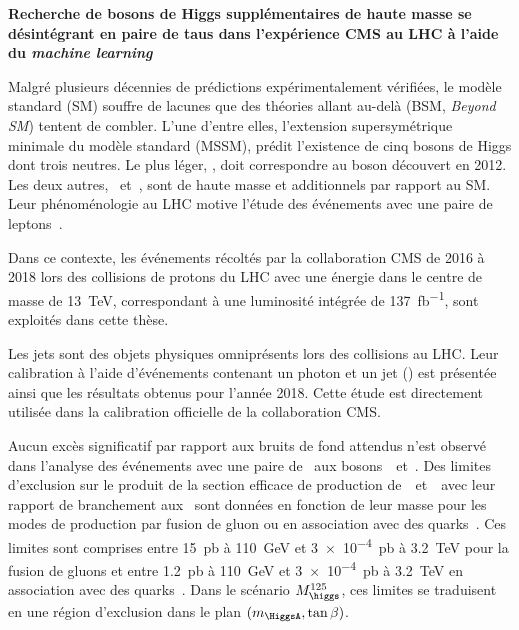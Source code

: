 \begin{center}
\LARGE
\bf
\sffamily
Recherche de bosons de Higgs supplémentaires de haute masse se désintégrant en paire de taus dans l'expérience CMS au LHC à l'aide du \emph{machine learning}
\end{center}

\vspace{2\baselineskip}

Malgré plusieurs décennies de prédictions expérimentalement vérifiées,
le modèle standard (SM) souffre de lacunes
que des théories allant au-delà (BSM, \emph{Beyond SM})
tentent de combler.
L'une d'entre elles,
l'extension supersymétrique minimale du modèle standard (MSSM),
prédit l'existence de cinq bosons de Higgs dont trois neutres.
Le plus léger, \higgs, doit correspondre au boson découvert en 2012.
Les deux autres, \Higgs\ et~\HiggsA, sont de haute masse et additionnels par rapport au SM.
Leur phénoménologie au LHC
motive l'étude des événements avec une paire de leptons~\tau.
\par
Dans ce contexte,
les événements récoltés par la collaboration CMS
de 2016 à 2018
lors des collisions de protons du LHC
avec une énergie dans le centre de masse de \SI{13}{\TeV},
correspondant à une luminosité intégrée de \SI{137}{\femto\barn^{-1}},
sont exploités dans cette thèse.
\par
Les jets sont des objets physiques omniprésents lors des collisions au LHC.
Leur calibration à l'aide d'événements contenant un photon et un jet (\Gjet) est présentée ainsi que les résultats obtenus pour l'année 2018.
Cette étude %
est directement utilisée dans la calibration officielle de la collaboration CMS.
\par
Aucun excès significatif par rapport aux bruits de fond attendus n'est observé
dans l'analyse des événements avec une paire de \tau\ aux bosons~\Higgs\ et~\HiggsA.
Des limites d'exclusion sur le produit de la section efficace de production de~\Higgs\ et~\HiggsA\ avec leur rapport de branchement aux \tau\ sont données
en fonction de leur masse
pour les modes de production par fusion de gluon ou en association avec des quarks~\quarkb.
Ces limites sont comprises entre
\SI{15}{\pico\barn} à \SI{110}{\GeV}
et
\SI{3e-4}{\pico\barn} à \SI{3.2}{\TeV}
pour la fusion de gluons
et entre
\SI{1.2}{\pico\barn} à \SI{110}{\GeV}
et
\SI{3e-4}{\pico\barn} à \SI{3.2}{\TeV}
en association avec des quarks~\quarkb.
Dans le scénario $M_{\higgs}^{125}$,
ces limites se traduisent en une région d'exclusion dans le plan $(m_{\HiggsA},\tan\beta)$.
